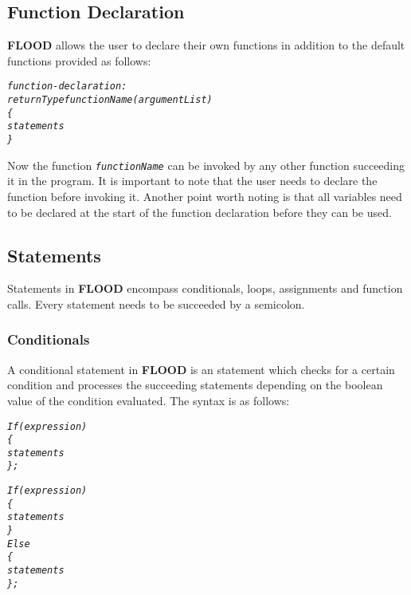 \documentclass[12pt]{report}
\begin{document}
\subsection{Function Declaration}

\textbf{FLOOD} allows the user to declare their own functions in addition to the default functions provided as follows:

\begin{alltt}\begin{singlespace}
         \textit{function-declaration:}
            \textit{returnType functionName (argumentList)
            \{
                statements
            \}}\end{singlespace}
\end{alltt}

Now the function \texttt{\textit{functionName}} can be invoked by any other function succeeding it in the program. It is important to note that the user needs to declare the function before invoking it.
Another point worth noting is that all variables need to be declared at the start of the function declaration before they can be used. 

\subsection{Statements}

Statements in \textbf{FLOOD} encompass conditionals, loops, assignments and function calls. Every statement needs to be succeeded by a semicolon.

\subsubsection{Conditionals}

A conditional statement in \textbf{FLOOD} is an statement which checks for a certain condition and processes the succeeding statements depending on the boolean value of the condition evaluated. The syntax is as follows:

\begin{alltt}\begin{singlespace}
            \textit{If (expression)
            \{
                statements
            \};}

            \textit{If (expression)
            \{
                statements
            \}
            Else
            \{
                statements
            \};}\end{singlespace}
\end{alltt}
\end{document}
